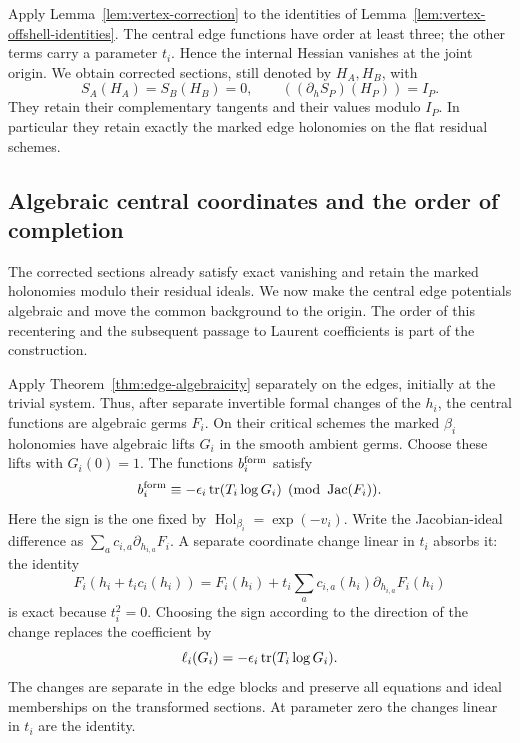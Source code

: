 Apply Lemma~\ref{lem:vertex-correction} to the identities of
Lemma~\ref{lem:vertex-offshell-identities}.
The central edge functions have order at least three; the other terms
carry a parameter $t_i$.  Hence the internal Hessian vanishes at the
joint origin.  We obtain corrected sections, still denoted by $H_A,H_B$,
with
\begin{equation}
\label{eq:vertex-exact-formal-sections}
 S_A(H_A)=S_B(H_B)=0,
 \qquad ((\partial_h S_P)(H_P))=I_P.
\end{equation}
They retain their complementary tangents and their values modulo $I_P$.
In particular they retain exactly the marked edge holonomies on the
flat residual schemes.

\subsection{Algebraic central coordinates and the order of completion}
\label{rem:tensor-recentering}

The corrected sections already satisfy exact vanishing and retain the
marked holonomies modulo their residual ideals. We now make the
central edge potentials algebraic and move the common background to
the origin. The order of this recentering and the subsequent passage
to Laurent coefficients is part of the construction.

Apply Theorem~\ref{thm:edge-algebraicity} separately on the edges,
initially at the trivial system.  Thus, after separate invertible formal
changes of the $h_i$, the central functions are algebraic germs $F_i$.
On their critical schemes the marked $\beta_i$ holonomies have algebraic
lifts $G_i$ in the smooth ambient germs.  Choose these lifts with
$G_i(0)=1$.  The functions $b_i^{\rm form}$ satisfy
\begin{equation}
\label{eq:vertex-log-mod-jacobian}
 b_i^{\rm form}\equiv -\epsilon_i\operatorname{tr}(T_i\log G_i)
                                      \pmod{\operatorname{Jac}(F_i)}.
\end{equation}
Here the sign is the one fixed by $\operatorname{Hol}_{\beta_i}=\exp(-v_i)$.
Write the Jacobian-ideal difference as
$\sum_a c_{i,a}\partial_{h_{i,a}}F_i$.  A separate coordinate change
linear in $t_i$ absorbs it: the identity
\[
 F_i(h_i+t_i c_i(h_i))
     =F_i(h_i)+t_i\sum_a c_{i,a}(h_i)\partial_{h_{i,a}}F_i(h_i)
\]
is exact because $t_i^2=0$.  Choosing the sign according to the direction
of the change replaces the coefficient by
\[
 \ell_i(G_i)=-\epsilon_i\operatorname{tr}(T_i\log G_i).
\]
The changes are separate in the edge blocks and preserve all equations
and ideal memberships on the transformed sections.  At parameter zero
the changes linear in $t_i$ are the identity.

